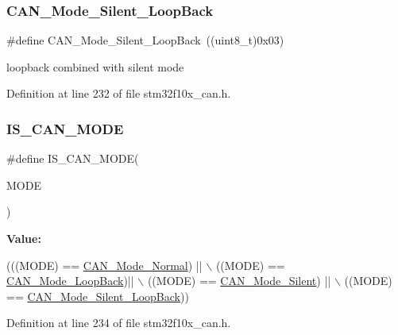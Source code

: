 \subsubsection{\texorpdfstring{C\+A\+N\+\_\+\+Mode\+\_\+\+Silent\+\_\+\+Loop\+Back}{CAN\_Mode\_Silent\_LoopBack}}
{\footnotesize\ttfamily \#define C\+A\+N\+\_\+\+Mode\+\_\+\+Silent\+\_\+\+Loop\+Back~((uint8\+\_\+t)0x03)}

loopback combined with silent mode 

Definition at line 232 of file stm32f10x\+\_\+can.\+h.

\mbox{\label{group___c_a_n___mode_ga5d6480c240edeba383b4e07d65814d98}} 
\subsubsection{\texorpdfstring{I\+S\+\_\+\+C\+A\+N\+\_\+\+M\+O\+DE}{IS\_CAN\_MODE}}
{\footnotesize\ttfamily \#define I\+S\+\_\+\+C\+A\+N\+\_\+\+M\+O\+DE(\begin{DoxyParamCaption}\item[{}]{M\+O\+DE }\end{DoxyParamCaption})}

{\bfseries Value\+:}
\begin{DoxyCode}
(((MODE) == \hyperlink{group___c_a_n___mode_gaaf1f48ab4917ccfd5fd31dd781d59e29}{CAN\_Mode\_Normal}) || \(\backslash\)
                           ((MODE) == \hyperlink{group___c_a_n___mode_gaad036c944403186eb3496ff65020c0ee}{CAN\_Mode\_LoopBack})|| \(\backslash\)
                           ((MODE) == \hyperlink{group___c_a_n___mode_gac05e5d666f18eb35e8da70e6e17e8fb8}{CAN\_Mode\_Silent}) || \(\backslash\)
                           ((MODE) == \hyperlink{group___c_a_n___mode_ga087afa0d24d2cf399225993573c984eb}{CAN\_Mode\_Silent\_LoopBack}))
\end{DoxyCode}


Definition at line 234 of file stm32f10x\+\_\+can.\+h.

